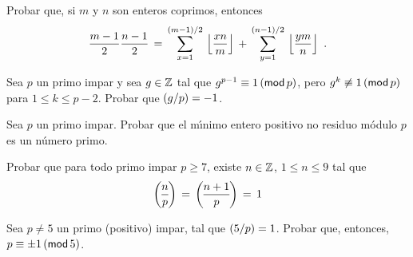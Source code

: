 \begin{ejerResiduos}
	Probar que, si $m$ y $n$ son enteros coprimos, entonces
	\begin{displaymath}
		\frac{m-1} 2\frac{n-1} 2\,=\,
			\sum_{x=1}^{(m-1)/2}\,\piso{\frac{xn} m}\,+\,
			\sum_{y=1}^{(n-1)/2}\,\piso{\frac{ym} n}
		\text{ .}
	\end{displaymath}
\end{ejerResiduos}

\begin{ejerResiduos}\label{ejer:residuos:generador}
	Sea $p$ un primo impar y sea $g\in\Enteros$ tal que
	$g^{p-1}\equiv 1\tmodulo[p]$, pero $g^k\not\equiv 1\tmodulo[p]$
	para $1\leq k\leq p-2$.
	Probar que $\tlegendre g p =-1$.
\end{ejerResiduos}

\begin{ejerResiduos}\label{ejer:residuos:minimo-noresiduo}
	Sea $p$ un primo impar. Probar que el m\'{\i}nimo
	entero positivo no residuo m\'odulo $p$ es un n\'umero primo.
\end{ejerResiduos}

\begin{ejerResiduos}\label{ejer:residuos:residuos-consecutivos}%
	Probar que para todo primo impar $p\geq 7$, existe
	$n\in\Enteros$, $1\leq n\leq 9$ tal que
	\begin{displaymath}
		\legendre n p \,=\,\legendre{n+1} p\,=\,1
	\end{displaymath}
\end{ejerResiduos}

\begin{ejerResiduos}%
	Sea $p\neq 5$ un primo (positivo) impar, tal que
	$\tlegendre 5 p=1$. Probar que, entonces,
	$p\equiv\pm 1\tmodulo[5]$.
\end{ejerResiduos}

